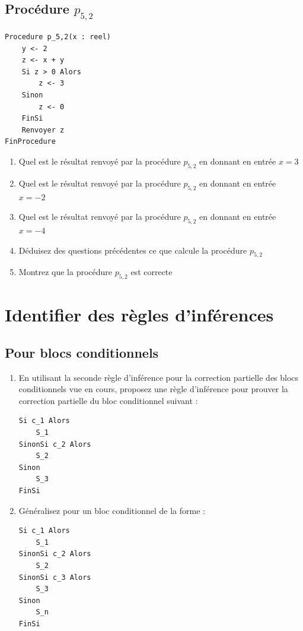 \documentclass[a4paper,11pt]{article}
\begin{document}
\subsection{Procédure $p_{5,2}$}

\begin{lstlisting}
Procedure p_5,2(x : reel)
    y <- 2
    z <- x + y
    Si z > 0 Alors
        z <- 3
    Sinon
        z <- 0
    FinSi
    Renvoyer z
FinProcedure
\end{lstlisting}

\begin{enumerate}
\item Quel est le résultat renvoyé par la procédure $p_{5,2}$ en donnant en entrée $x = 3$

\item Quel est le résultat renvoyé par la procédure $p_{5,2}$ en donnant en entrée $x = -2$

\item Quel est le résultat renvoyé par la procédure $p_{5,2}$ en donnant en entrée $x = -4$

\item Déduisez des questions précédentes ce que calcule la procédure $p_{5,2}$

\item Montrez que la procédure $p_{5,2}$ est correcte
\end{enumerate}

\section{Identifier des règles d'inférences}

\subsection{Pour blocs conditionnels}

\begin{enumerate}
\item En utilisant la seconde règle d'inférence pour la correction partielle des blocs conditionnels vue en cours, proposez une règle d'inférence pour prouver la correction partielle du bloc conditionnel suivant :

\begin{lstlisting}
Si c_1 Alors
    S_1
SinonSi c_2 Alors
    S_2
Sinon
    S_3
FinSi
\end{lstlisting}

\item Généralisez pour un bloc conditionnel de la forme :

\begin{lstlisting}
Si c_1 Alors
    S_1
SinonSi c_2 Alors
    S_2
SinonSi c_3 Alors
    S_3
Sinon
    S_n
FinSi
\end{lstlisting}
\end{enumerate}
\end{document}
